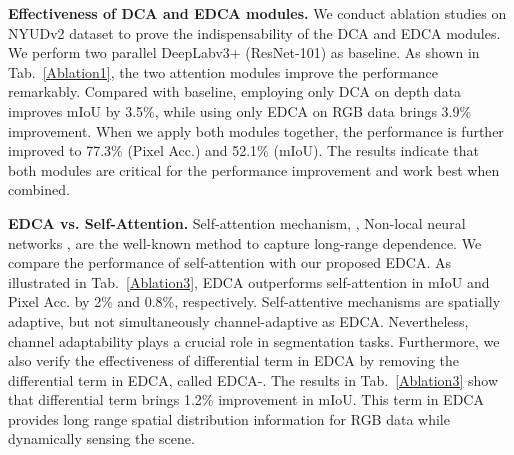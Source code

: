 \documentclass[10pt,twocolumn,letterpaper]{article}
\begin{document}
\textbf{Effectiveness of DCA and EDCA modules.}
We conduct ablation studies on NYUDv2 dataset to prove the indispensability of the DCA and EDCA modules. We perform two parallel DeepLabv3+ (ResNet-101) as baseline. As shown in Tab.~\ref{Ablation1},
the two attention modules improve the performance remarkably. Compared with baseline, employing only DCA on depth data
improves mIoU by 3.5\%, while using only EDCA on RGB data brings 3.9\% improvement. When we apply both modules together,
the performance is further improved to 77.3\% (Pixel Acc.) and 52.1\% (mIoU). The results indicate that both modules are
critical for the performance improvement and work best when combined.



\begin{table}[]
   \centering
   \caption{Superiority of EDCA compared with Self-Attention \cite{wang2018non} and EDCA- on NYUDv2 test set. EDCA- denotes
      EDCA without differential term. All the three modules are for RGB data to capture long-range dependence and no
      operations are performed on the depth data.}
   \label{Ablation3}
\end{table}

\textbf{EDCA vs. Self-Attention.}
Self-attention mechanism, , Non-local neural networks \cite{wang2018non}, are the well-known method to capture
long-range dependence. We compare the performance of self-attention with our proposed EDCA. As illustrated in Tab.~\ref{Ablation3}, EDCA outperforms self-attention in mIoU and Pixel Acc.
by 2\%  and 0.8\%, respectively. Self-attentive mechanisms are spatially adaptive, but not simultaneously channel-adaptive as EDCA.
Nevertheless, channel adaptability plays a crucial role in segmentation tasks. Furthermore, we also verify the effectiveness
of differential term in EDCA by removing the differential term in EDCA, called EDCA-. The results in Tab.~\ref{Ablation3} show
that differential term brings 1.2\% improvement in mIoU. This term in EDCA provides long range spatial distribution
information for RGB data while dynamically sensing the scene.
\end{document}
